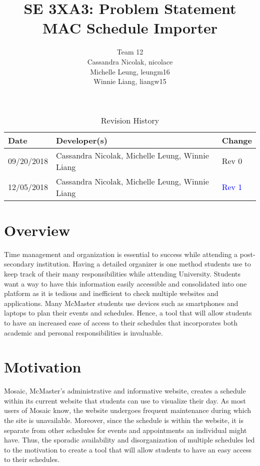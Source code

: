 \documentclass{article}
\title{SE 3XA3: Problem Statement\\MAC Schedule Importer}
\author{Team 12%
		\\ Cassandra Nicolak, nicolace
		\\ Michelle Leung, leungm16
		\\ Winnie Liang, liangw15
}
\date{}
\begin{document}
\begin{table}[hp]
\caption{Revision History} \label{TblRevisionHistory}
\begin{tabularx}{\textwidth}{llX}
\toprule
\textbf{Date} & \textbf{Developer(s)} & \textbf{Change}\\
\midrule
09/20/2018 & Cassandra Nicolak, Michelle Leung, Winnie Liang & Rev 0\\ 
\color{blue}
12/05/2018 & \color{blue} Cassandra Nicolak, Michelle Leung, Winnie Liang & \textcolor{blue}{Rev 1}\\

\bottomrule
\end{tabularx}
\end{table}

\newpage

\maketitle

\section{Overview}
\hspace{5mm}Time management and organization is essential to success while attending a post-secondary institution. Having a detailed organizer is one method students use to keep track of their many responsibilities while attending University. Students want a way to have this information easily accessible and consolidated into one platform as it is tedious and inefficient to check multiple websites and applications. Many McMaster students use devices such as smartphones and laptops to plan their events and schedules. Hence, a tool that will allow students to have an increased ease of access to their schedules that incorporates both academic and personal responsibilities is invaluable.


\section{Motivation}
\hspace{5mm}Mosaic, McMaster's administrative and informative website, creates a schedule within its current website that students can use to visualize their day. \color{blue} As most users of Mosaic know, the website undergoes frequent maintenance during which the site is unavailable. Moreover, since the schedule is within the website, it is separate from other schedules for events and appointments an individual might have. Thus, the sporadic availability and disorganization of multiple schedules led to the motivation to create a tool that will allow students to have an easy access to their schedules.\color{black}\\
\end{document}
